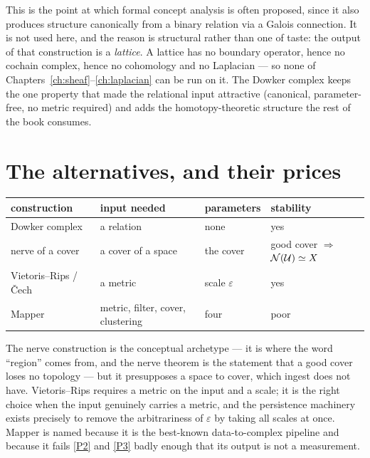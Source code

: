 \begin{hon}\Hon
This is the point at which formal concept analysis is often proposed, since
it also produces structure canonically from a binary relation via a Galois
connection. It is not used here, and the reason is structural rather than one
of taste: the output of that construction is a \emph{lattice}. A lattice has
no boundary operator, hence no cochain complex, hence no cohomology and no
Laplacian --- so none of Chapters~\ref{ch:sheaf}--\ref{ch:laplacian} can be
run on it. The Dowker complex keeps the one property that made the relational
input attractive (canonical, parameter-free, no metric required) and adds the
homotopy-theoretic structure the rest of the book consumes.
\end{hon}

\section{The alternatives, and their prices}\label{sec:alternatives}

\begin{center}
\begin{tabular}{@{}>{\raggedright\arraybackslash}p{}%
                  >{\raggedright\arraybackslash}p{}%
                  >{\raggedright\arraybackslash}p{}%
                  >{\raggedright\arraybackslash}p{}@{}}
\toprule
\textbf{construction} & \textbf{input needed} & \textbf{parameters} &
\textbf{stability} \\
\midrule
Dowker complex & a relation & none & yes~\cite{ChowdhuryMemoli} \\
\addlinespace[2pt]
nerve of a cover & a cover of a space & the cover &
  good cover $\Rightarrow$ $\mathcal{N}(\mathcal U)\simeq X$ \\
\addlinespace[2pt]
Vietoris--Rips / \v Cech & a metric & scale $\varepsilon$ &
  yes~\cite{CEH,ChazalStructure} \\
\addlinespace[2pt]
Mapper & metric, filter, cover, clustering & four & poor \\
\bottomrule
\end{tabular}
\end{center}

The nerve construction is the conceptual archetype --- it is where the word
``region'' comes from, and the nerve theorem is the statement that a good cover
loses no topology --- but it presupposes a space to cover, which ingest does
not have. Vietoris--Rips requires a metric on the input and a scale; it is the
right choice when the input genuinely carries a metric, and the persistence
machinery exists precisely to remove the arbitrariness of $\varepsilon$ by
taking all scales at once. Mapper is named because it is the best-known
data-to-complex pipeline and because it fails \ref{P2} and \ref{P3} badly
enough that its output is not a measurement.

